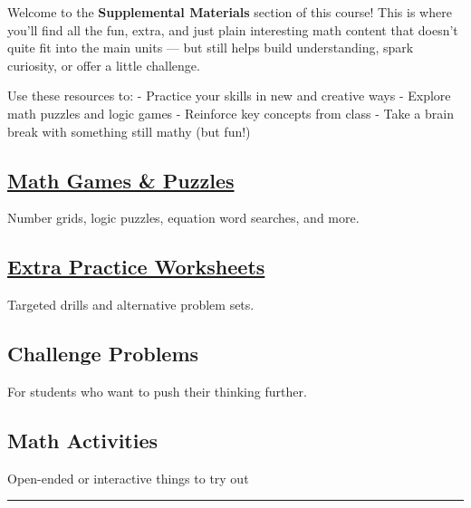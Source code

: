 \documentclass[
  letterpaper,
  DIV=11,
  numbers=noendperiod]{scrreprt}
\begin{document}
Welcome to the \textbf{Supplemental Materials} section of this course!
This is where you'll find all the fun, extra, and just plain interesting
math content that doesn't quite fit into the main units --- but still
helps build understanding, spark curiosity, or offer a little challenge.

Use these resources to: - Practice your skills in new and creative ways
- Explore math puzzles and logic games - Reinforce key concepts from
class - Take a brain break with something still mathy (but fun!)

\subsection*{\texorpdfstring{\href{math_games_and_puzzles/index.md}{Math
Games \& Puzzles}}{Math Games \& Puzzles}}\label{math-games-puzzles}

Number grids, logic puzzles, equation word searches, and more.

\subsection*{\texorpdfstring{\href{worksheets/index.qmd}{Extra Practice
Worksheets}}{Extra Practice Worksheets}}\label{extra-practice-worksheets}

Targeted drills and alternative problem sets.

\subsection*{Challenge Problems}\label{challenge-problems}

For students who want to push their thinking further.

\subsection*{Math Activities}\label{math-activities}

Open-ended or interactive things to try out

\begin{center}\rule{0.5\linewidth}{0.5pt}\end{center}
\end{document}
